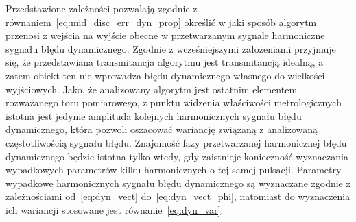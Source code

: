 Przedstawione zależności pozwalają zgodnie z równaniem~\eqref{eq:mid_disc_err_dyn_prop} określić w jaki sposób algorytm przenosi z wejścia na wyjście obecne w przetwarzanym sygnale harmoniczne sygnału błędu dynamicznego. Zgodnie z wcześniejszymi założeniami przyjmuje się, że przedstawiana transmitancja algorytmu jest transmitancją idealną, a zatem obiekt ten nie wprowadza błędu dynamicznego własnego do wielkości wyjściowych. Jako, że analizowany algorytm jest ostatnim elementem rozważanego toru pomiarowego, z punktu widzenia właściwości metrologicznych istotna jest jedynie amplituda kolejnych harmonicznych sygnału błędu dynamicznego, która pozwoli oszacować wariancję związaną z analizowaną częstotliwością sygnału błędu. Znajomość fazy przetwarzanej harmonicznej błędu dynamicznego będzie istotna tylko wtedy, gdy zaistnieje konieczność wyznaczania wypadkowych parametrów kilku harmonicznych o tej samej pulsacji. Parametry wypadkowe harmonicznych sygnału błędu dynamicznego są wyznaczane zgodnie z zależnościami od~\eqref{eq:dyn_vect} do~\eqref{eq:dyn_vect_phi}, natomiast do wyznaczenia ich wariancji stosowane jest równanie~\eqref{eq:dyn_var}.


